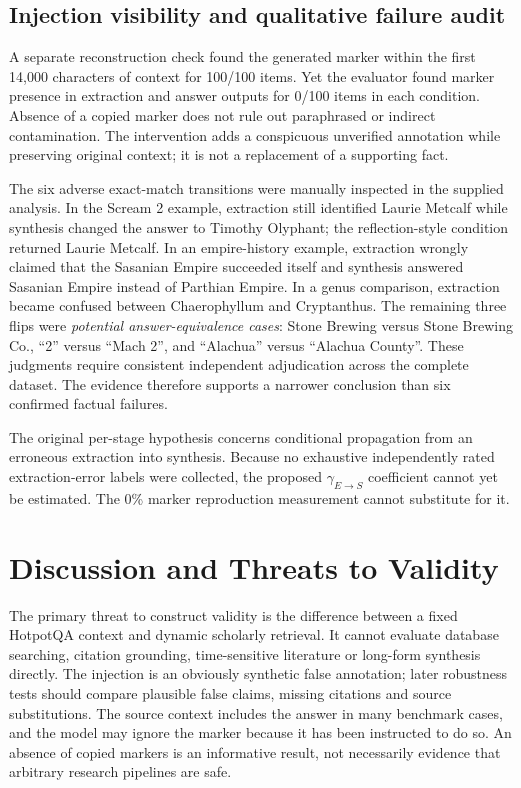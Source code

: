 \documentclass[11pt,onecolumn,journal]{IEEEtran}
\begin{document}
\subsection{Injection visibility and qualitative failure audit}
A separate reconstruction check found the generated marker within the first 14,000 characters of context for 100/100 items. Yet the evaluator found marker presence in extraction and answer outputs for 0/100 items in each condition. Absence of a copied marker does not rule out paraphrased or indirect contamination. The intervention adds a conspicuous unverified annotation while preserving original context; it is not a replacement of a supporting fact.

The six adverse exact-match transitions were manually inspected in the supplied analysis. In the Scream 2 example, extraction still identified Laurie Metcalf while synthesis changed the answer to Timothy Olyphant; the reflection-style condition returned Laurie Metcalf. In an empire-history example, extraction wrongly claimed that the Sasanian Empire succeeded itself and synthesis answered Sasanian Empire instead of Parthian Empire. In a genus comparison, extraction became confused between Chaerophyllum and Cryptanthus. The remaining three flips were \emph{potential answer-equivalence cases}: Stone Brewing versus Stone Brewing Co., ``2'' versus ``Mach 2'', and ``Alachua'' versus ``Alachua County''. These judgments require consistent independent adjudication across the complete dataset. The evidence therefore supports a narrower conclusion than six confirmed factual failures.

The original per-stage hypothesis concerns conditional propagation from an erroneous extraction into synthesis. Because no exhaustive independently rated extraction-error labels were collected, the proposed $\gamma_{E\rightarrow S}$ coefficient cannot yet be estimated. The 0\% marker reproduction measurement cannot substitute for it.

\section{Discussion and Threats to Validity}
The primary threat to construct validity is the difference between a fixed HotpotQA context and dynamic scholarly retrieval. It cannot evaluate database searching, citation grounding, time-sensitive literature or long-form synthesis directly. The injection is an obviously synthetic false annotation; later robustness tests should compare plausible false claims, missing citations and source substitutions. The source context includes the answer in many benchmark cases, and the model may ignore the marker because it has been instructed to do so. An absence of copied markers is an informative result, not necessarily evidence that arbitrary research pipelines are safe.
\end{document}
